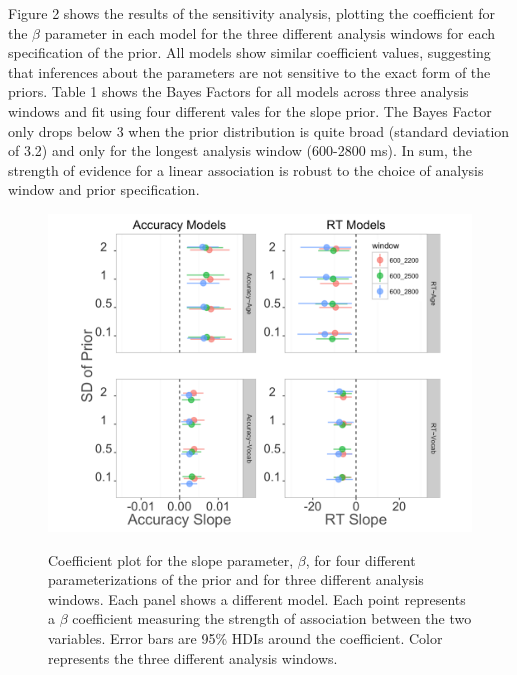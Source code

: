 \documentclass[a4paper]{article}
\begin{document}
Figure 2 shows the results of the sensitivity analysis, plotting the coefficient for the $\beta$ parameter in each model for the three different analysis windows for each specification of the prior. All models show similar coefficient values, suggesting that inferences about the parameters are not sensitive to the exact form of the priors. Table 1 shows the Bayes Factors for all models across three analysis windows and fit using four different vales for the slope prior. The Bayes Factor only drops below 3  when the prior distribution is quite broad (standard deviation of 3.2) and only for the longest analysis window (600-2800 ms). In sum, the strength of evidence for a linear association is robust to the choice of analysis window and prior specification.

\begin{figure}[hb]
	{\centering \includegraphics[width=12cm]{supp_coef_plot.png}}
	\caption{Coefficient plot for the slope parameter, $\beta$, for four different parameterizations of the prior and for three different analysis windows. Each panel shows a different model. Each point represents a $\beta$ coefficient measuring the strength of association between the two variables. Error bars are 95\% HDIs around the coefficient. Color represents the three different analysis windows. }\label{fig:coef_plot}
\end{figure}
\end{document}
